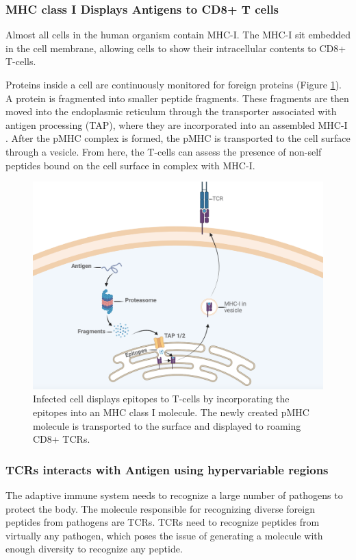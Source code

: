 \subsubsection{MHC class I Displays Antigens to CD8+ T cells}
Almost all cells in the human organism contain MHC-I. The MHC-I sit embedded in the cell membrane, allowing cells to show their intracellular contents to CD8+ T-cells.

Proteins inside a cell are continuously monitored for foreign proteins (Figure \ref{fig:mhc_presentation}). A protein is fragmented into smaller peptide fragments. These fragments are then moved into the endoplasmic reticulum through the transporter associated with antigen processing (TAP), where they are incorporated into an assembled MHC-I \cite{Abele2004TheProcessing}. After the pMHC complex is formed, the pMHC is transported to the cell surface through a vesicle. From here, the T-cells can assess the presence of non-self peptides bound on the cell surface in complex with MHC-I.

\begin{figure}
    \centering
    \includegraphics[width=\linewidth]{figures/MHC_representation.png}
    \caption{Infected cell displays epitopes to T-cells by incorporating the epitopes into an MHC class I molecule. The newly created pMHC molecule is transported to the surface and displayed to roaming CD8+ TCRs.}
    \label{fig:mhc_presentation}
\end{figure}

\subsubsection{TCRs interacts with Antigen using hypervariable regions}
The adaptive immune system needs to recognize a large number of pathogens to protect the body. The molecule responsible for recognizing diverse foreign peptides from pathogens are TCRs. TCRs need to recognize peptides from virtually any pathogen, which poses the issue of generating a molecule with enough diversity to recognize any peptide.

